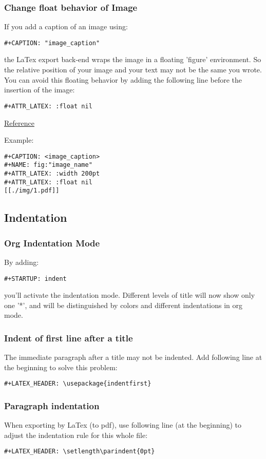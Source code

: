 \documentclass[11pt]{article}
\begin{document}
\subsubsection{Change float behavior of Image}
\label{sec:org98e9dae}
If you add a caption of an image using:
\begin{Verbatim}[frame=single]
#+CAPTION: "image_caption"
\end{Verbatim}
the LaTex export back-end wraps the image in a floating 'figure' environment. So the relative position of your image and your text may not be the same you wrote. You can avoid this floating behavior by adding the following line before the insertion of the image:
\begin{Verbatim}[frame=single]
#+ATTR_LATEX: :float nil
\end{Verbatim}

\href{https://orgmode.org/manual/Images-in-LaTeX-export.html}{Reference}

Example:
\begin{Verbatim}[frame=single]
#+CAPTION: <image_caption>
#+NAME: fig:"image_name"
#+ATTR_LATEX: :width 200pt
#+ATTR_LATEX: :float nil
[[./img/1.pdf]]
\end{Verbatim}

\subsection{Indentation}
\label{sec:orgb2d013a}
\subsubsection{Org Indentation Mode}
\label{sec:orgf7dcfff}
By adding:
\begin{Verbatim}[frame=single]
#+STARTUP: indent
\end{Verbatim}
you'll activate the indentation mode. Different levels of title will now show only one '*', and will be distinguished by colors and different indentations in org mode.

\subsubsection{Indent of first line after a title}
\label{sec:org50f443f}
The immediate paragraph after a title may not be indented. Add following line at the beginning to solve this problem:
\begin{Verbatim}[frame=single]
#+LATEX_HEADER: \usepackage{indentfirst}
\end{Verbatim}
\subsubsection{Paragraph indentation}
\label{sec:org94cef08}
When exporting by LaTex (to pdf), use following line (at the beginning) to adjust the indentation rule for this whole file:
\begin{Verbatim}[frame=single]
#+LATEX_HEADER: \setlength\parindent{0pt}
\end{Verbatim}
\end{document}
